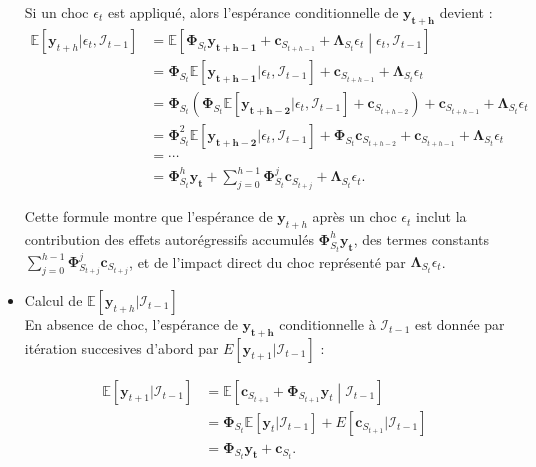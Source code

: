 \begin{sloppypar}
\begin{itemize}
\medskip
Si un choc $\epsilon_t$ est appliqué, alors l'espérance conditionnelle de $\bm{y_{t+h}}$ devient :
\begin{equation}
    \begin{split}
    \mathbb{E}[\bm{y}_{t+h} | \epsilon_t, \mathcal{I}_{t-1}] &= \mathbb{E}\left[\bm{\Phi}_{S_t} \bm{y_{t+h-1}} + \bm{c}_{S_{t+h-1}} + \bm{\Lambda}_{S_t} \epsilon_t \middle| \epsilon_t, \mathcal{I}_{t-1} \right] \\
    &= \bm{\Phi}_{S_t} \mathbb{E}[\bm{y_{t+h-1}} | \epsilon_t, \mathcal{I}_{t-1}] + \bm{c}_{S_{t+h-1}} + \bm{\Lambda}_{S_t} \epsilon_t \\
    &= \bm{\Phi}_{S_t} \left( \bm{\Phi}_{S_t} \mathbb{E}[\bm{y_{t+h-2}} | \epsilon_t, \mathcal{I}_{t-1}] + \bm{c}_{S_{t+h-2}} \right) + \bm{c}_{S_{t+h-1}} + \bm{\Lambda}_{S_t} \epsilon_t \\
    &= \bm{\Phi}^2_{S_t} \mathbb{E}[\bm{y_{t+h-2}} | \epsilon_t, \mathcal{I}_{t-1}] + \bm{\Phi}_{S_t} \bm{c}_{S_{t+h-2}} + \bm{c}_{S_{t+h-1}} + \bm{\Lambda}_{S_t} \epsilon_t \\
    &= \cdots \\
    &= \bm{\Phi}^h_{S_t} \bm{y_t} + \sum_{j=0}^{h-1} \bm{\Phi}^j_{S_t} \bm{c}_{S_{t+j}} + \bm{\Lambda}_{S_t} \epsilon_t.
    \end{split}
\end{equation}

Cette formule montre que l'espérance de $\bm{y}_{t+h}$ après un choc $\epsilon_t$ inclut la contribution des effets autorégressifs accumulés $\bm{\Phi}_{S_t}^h \bm{y_t}$, des termes constants $\sum_{j=0}^{h-1} \bm{\Phi}^j_{S_{t+j}} \bm{c}_{S_{t+j}}$, et de l'impact direct du choc représenté par $\bm{\Lambda}_{S_t} \epsilon_t$.\\

\item {Calcul de $\mathbb{E}[\bm{y}_{t+h} | \mathcal{I}_{t-1}]$}
\\

En absence de choc, l'espérance de $\bm{y_{t+h}}$ conditionnelle à $\mathcal{I}_{t-1}$ est donnée par itération succesives d'abord par     $E[\bm{y}_{t+1} | \mathcal{I}_{t-1}]$ :

\begin{equation}
\begin{split}
    \mathbb{E}[\bm{y}_{t+1} | \mathcal{I}_{t-1}] &= \mathbb{E}\left[\bm{c}_{S_{t+1}} + \bm{\Phi}_{S_{t+1}} \bm{y}_{t} \middle| \mathcal{I}_{t-1} \right] \\
    &= \bm{\Phi}_{S_t} \mathbb{E}[\bm{y}_{t} | \mathcal{I}_{t-1}] + E[\bm{c}_{S_{t+1}} | \mathcal{I}_{t-1}] \\
    &= \bm{\Phi}_{S_t} \bm{y_t} + \bm{c}_{S_t}.    
\end{split}
\end{equation}


\end{itemize}
\end{sloppypar}
